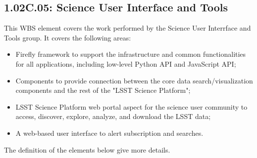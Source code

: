 \subsection{1.02C.05: Science User Interface and Tools}

This WBS element covers the work performed by the Science User Interrface and Tools group. It covers the following areas:
\begin{itemize}
\item{Firefly framework to support the infrastructure and common functionalities for all applications, including low-level Python API and JavaScript API;}
\item{Components to provide connection between the core data search/visualization components and the rest of the "LSST Science Platform";}
\item{LSST Science Platform web portal aspect for the science user community to access, discover, explore, analyze, and download the LSST data;}
\item{A web-based user interface to alert subscription and searches.}
\end{itemize}


The definition of the elements below give more details.
